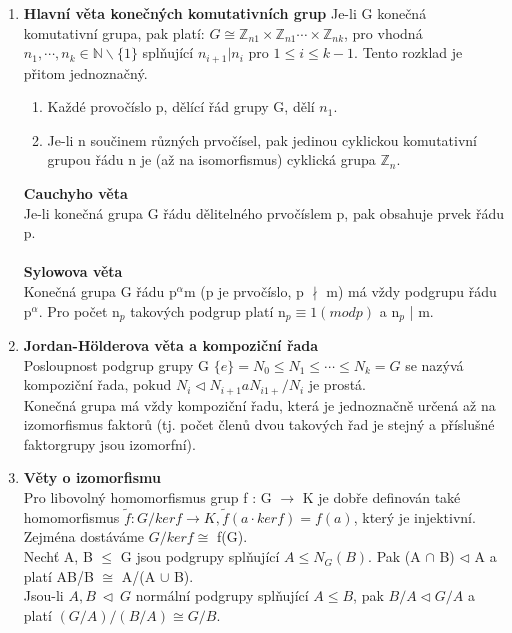 \documentclass[12pt,a4paper]{article}
\begin{document}
\begin{enumerate}
	\item \textbf{Hlavní věta konečných komutativních grup}
		Je-li G konečná komutativní grupa, pak platí: $G\cong \mathbb{Z}_{n1} \times \mathbb{Z}_{n1}\cdots\times\mathbb{Z}_{nk}$, pro vhodná $n_1,\cdots,n_k\in\mathbb{N}\backslash\{1\}$ splňující $n_{i+1}|n_i$ pro $1 \leq i \leq k-1$. Tento rozklad je přitom jednoznačný.
		\begin{enumerate}
			\item Každé provočíslo p, dělící řád grupy G, dělí $n_1$.
			\item Je-li n součinem různých prvočísel, pak jedinou cyklickou komutativní grupou řádu n je (až na isomorfismus) cyklická grupa $\mathbb{Z}_n$.
		\end{enumerate}
		
		\textbf{Cauchyho věta} \\
		Je-li konečná grupa G řádu dělitelného prvočíslem p, pak obsahuje prvek řádu p.\\ \\
		\textbf{Sylowova věta} \\
		Konečná grupa G řádu p$^\alpha$m (p je prvočíslo, p $\nmid$ m) má vždy podgrupu řádu p$^\alpha$. Pro počet n$_p$ takových podgrup platí n$_p \equiv 1 (mod p)$ a n$_p$ | m. 
		
	\item \textbf{Jordan-Hölderova věta a kompoziční řada} \\
	Posloupnost podgrup grupy G $\{e\} = N_0 \leq N_1 \leq \cdots \leq N_k = G$ se nazývá kompoziční řada, pokud $N_i \lhd N_{i+1} a N_{i1+}/N_i$ je prostá.  \\Konečná grupa má vždy kompoziční řadu, která je jednoznačně určená až na izomorfismus faktorů (tj. počet členů dvou takových řad je stejný a příslušné faktorgrupy jsou izomorfní).
	
	\item \textbf{Věty o izomorfismu} \\
	Pro libovolný homomorfismus grup f : G $\rightarrow$ K je dobře definován také homomorfismus $\tilde{f} : G/ker f \rightarrow K, \tilde{f}(a \cdot ker f) = f(a)$, který je injektivní. Zejména dostáváme $G/ker f \cong$ f(G). \\
	
	Nechť A, B $\leq$ G jsou podgrupy splňující $A \leq N_G(B)$. Pak (A $\cap$ B) $\lhd$ A a platí AB/B $\cong$ A/(A $\cup$ B). \\
	
	Jsou-li $A, B\ \lhd \ G$ normální podgrupy splňující $A \leq B$, pak $B/A \lhd G/A$ a platí $(G/A)/(B/A) \cong G/B$. \\
	

\end{enumerate}
\end{document}
